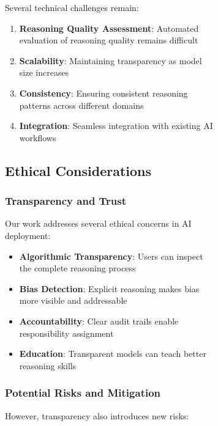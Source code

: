 \begin{figure}[H]
\begin{table}[H]
\begin{figure}[H]
\begin{table}[H]
Several technical challenges remain:

\begin{enumerate}
    \item \textbf{Reasoning Quality Assessment}: Automated evaluation of reasoning quality remains difficult
    \item \textbf{Scalability}: Maintaining transparency as model size increases
    \item \textbf{Consistency}: Ensuring consistent reasoning patterns across different domains
    \item \textbf{Integration}: Seamless integration with existing AI workflows
\end{enumerate}

\subsection{Ethical Considerations}

\subsubsection{Transparency and Trust}

Our work addresses several ethical concerns in AI deployment:

\begin{itemize}
    \item \textbf{Algorithmic Transparency}: Users can inspect the complete reasoning process
    \item \textbf{Bias Detection}: Explicit reasoning makes bias more visible and addressable
    \item \textbf{Accountability}: Clear audit trails enable responsibility assignment
    \item \textbf{Education}: Transparent models can teach better reasoning skills
\end{itemize}

\subsubsection{Potential Risks and Mitigation}

However, transparency also introduces new risks:


\end{table}
\end{figure}
\end{table}
\end{figure}
